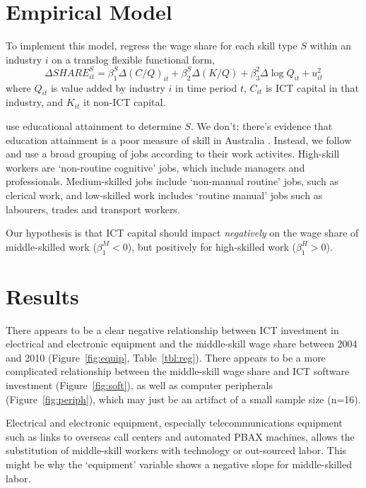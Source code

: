 \documentclass[a4paper]{article}
\begin{document}
\section{Empirical Model}

To implement this model, \citet{Michaels2010} regress the wage share for each skill type $S$ within an industry $i$ on a translog flexible functional form,
\begin{equation}
  \Delta SHARE^S_{it} = \beta^S_1\Delta(C/Q)_{it} + \beta^S_2\Delta(K/Q) + \beta^2_3\Delta\log Q_{it} + u^2_{it}
\end{equation}
where $Q_{it}$ is value added by industry $i$ in time period $t$, $C_{it}$ is ICT capital in that industry, and $K_{it}$ it non-ICT capital. 

\citet{Michaels2010} use educational attainment to determine $S$. We don't; there's evidence that education attainment is a poor measure of skill in Australia \citep{Coelli2009}. Instead, we follow \citet{Goos2007} and use a broad grouping of jobs according to their work activites. High-skill workers are `non-routine cognitive' jobs, which include managers and professionals. Medium-skilled jobs include `non-manual routine' jobs, such as clerical work, and low-skilled work includes `routine manual' jobs such as labourers, trades and transport workers.

Our hypothesis is that ICT capital should impact {\em negatively} on the wage share of middle-skilled work ($\beta_1^M<0$), but positively for high-skilled work ($\beta_1^H>0$).

\section{Results}

There appears to be a clear negative relationship between ICT investment in electrical and electronic equipment and the middle-skill wage share between 2004 and 2010 (Figure~\ref{fig:equip}, Table~\ref{tbl:reg}). There appears to be a more complicated relationship between the middle-skill wage share and ICT software investment (Figure~\ref{fig:soft}), as well as computer peripherals (Figure~\ref{fig:periph}), which may just be an artifact of a small sample size (n=16).

Electrical and electronic equipment, especially telecommunications equipment such as links to overseas call centers and automated PBAX machines, allows the substitution of middle-skill workers with technology or out-sourced labor. This might be why the `equipment' variable shows a negative slope for middle-skilled labor.
\end{document}
